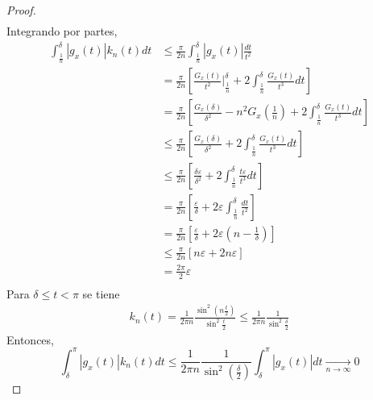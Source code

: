 \documentclass[12pt]{report}
\theoremstyle{largebreak}
\newcommand\abs[1]{\ensuremath{\left|#1\right|}}
\begin{document}
\begin{proof}
\begin{equation*}
\begin{split}
            \end{split}
        \end{equation*}
        Integrando por partes,
        \begin{equation*}
            \begin{split}
                \int_{\frac{1}{n}}^\delta\abs{g_x(t)}k_n(t)dt&\leq\frac{\pi}{2n}\int_{\frac{1}{n}}^\delta\abs{g_x(t)}\frac{dt}{t^2}\\
                &=\frac{\pi}{2n}\left[\frac{G_x(t)}{t^2}\Big|_{\frac{1}{n}}^{\delta}+2\int_{\frac{1}{n}}^\delta \frac{G_x(t)}{t^3}dt\right]\\
                &=\frac{\pi}{2n}\left[\frac{G_x(\delta)}{\delta^2}-n^2G_x(\frac{1}{n})+2\int_{\frac{1}{n}}^\delta \frac{G_x(t)}{t^3}dt\right]\\
                &\leq\frac{\pi}{2n}\left[\frac{G_x(\delta)}{\delta^2}+2\int_{\frac{1}{n}}^\delta \frac{G_x(t)}{t^3}dt\right]\\
                &\leq\frac{\pi}{2n}\left[\frac{\delta\varepsilon}{\delta^2}+2\int_{\frac{1}{n}}^\delta \frac{t\varepsilon}{t^3}dt\right]\\
                &=\frac{\pi}{2n}\left[\frac{\varepsilon}{\delta}+2\varepsilon\int_{\frac{1}{n}}^\delta \frac{dt}{t^2}\right]\\
                &=\frac{\pi}{2n}\left[\frac{\varepsilon}{\delta}+2\varepsilon\left(n-\frac{1}{\delta} \right) \right]\\
                &\leq\frac{\pi}{2n}\left[n\varepsilon+2n\varepsilon\right]\\
                &=\frac{2\pi}{2}\varepsilon\\
            \end{split}
        \end{equation*}
        Para $\delta\leq t<\pi$ se tiene
        \begin{equation*}
            \begin{split}
                k_n(t)=\frac{1}{2\pi n}\frac{\sin^2\left(n\frac{t}{2} \right)}{\sin^2\frac{t}{2}}\leq\frac{1}{2\pi n}\frac{1}{\sin^2\frac{\delta}{2}}
            \end{split}
        \end{equation*}
        Entonces,
        \begin{equation*}
            \int_\delta^{\pi}\abs{g_x(t)}k_n(t)dt\leq\frac{1}{2\pi n}\frac{1}{\sin^2\left(\frac{\delta}{2} \right)}\int_\delta^{\pi}\abs{g_x(t)}dt\underset{ n\rightarrow\infty}{\rightarrow}0
        \end{equation*}

\end{proof}
\end{document}
